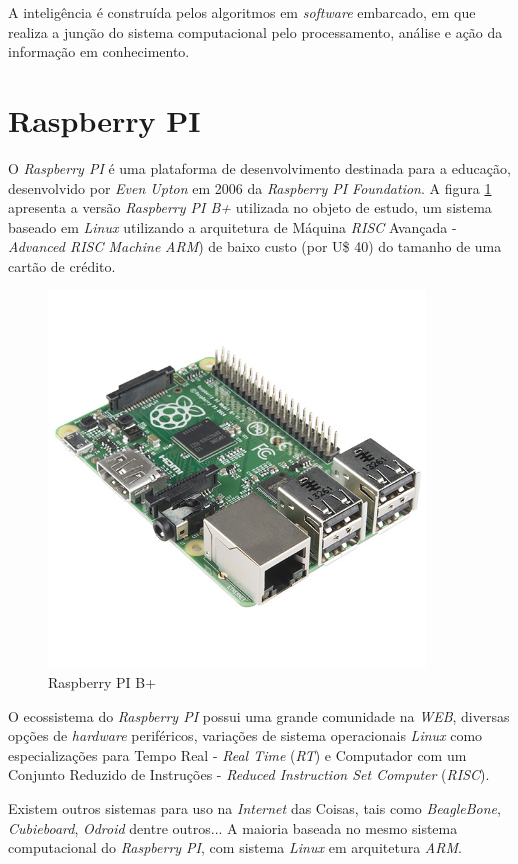 A inteligência é construída pelos algoritmos em \textit{software} embarcado, em
que realiza a junção do sistema computacional pelo processamento, análise e
ação da informação em conhecimento.

\section{Raspberry PI}

O \textit{Raspberry PI} é uma plataforma de desenvolvimento destinada para a
educação, desenvolvido por \textit{Even Upton} em 2006 da \textit{Raspberry PI
Foundation}. A figura \ref{fig:raspberrypi} apresenta a versão
\textit{Raspberry PI B+} utilizada no objeto de estudo, um sistema baseado em
\textit{Linux} utilizando a arquitetura de Máquina \textit{RISC} Avançada -
\textit{Advanced RISC Machine} \textit{ARM}) de baixo custo (por U\$ 40) do
tamanho de uma cartão de crédito.

\begin{figure}[H]
    \centering
    \includegraphics[width=10cm, height=10cm]{figuras/raspberrypi}
    \caption{Raspberry PI B+}
    \label{fig:raspberrypi}
\end{figure}

O ecossistema do \textit{Raspberry PI} possui uma grande comunidade na
\textit{WEB}, diversas opções de \textit{hardware} periféricos, variações de
sistema operacionais \textit{Linux} como especializações para Tempo Real -
\textit{Real Time} (\textit{RT}) e Computador com um Conjunto Reduzido de
Instruções - \textit{Reduced Instruction Set Computer} (\textit{RISC}).

Existem outros sistemas para uso na \textit{Internet} das Coisas, tais como
\textit{BeagleBone}, \textit{Cubieboard}, \textit{Odroid} dentre outros... A
maioria baseada no mesmo sistema computacional do \textit{Raspberry PI}, com
sistema \textit{Linux} em arquitetura \textit{ARM}.
